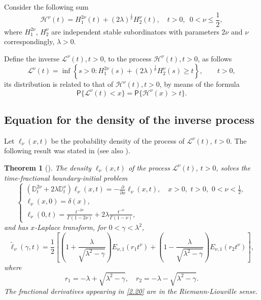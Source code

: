 \documentclass[12pt]{article}
\theoremstyle{definition}
\theoremstyle{plain}
\newtheorem{theorem}{Theorem}
\newcommand{\Prob}{\mathsf{P}}
\begin{document}
Consider the following sum
	\begin{equation}\label{2.1}
		\mathcal{H}^\nu(t) = H_1^{2\nu}(t) + (2\lambda)^{\frac{1}{\nu}} H_2^\nu(t), \quad t > 0,\,\,\, 0 < \nu \le \frac{1}{2},
	\end{equation}
	where  $H_1^{2\nu}$, $H_2^\nu$  are independent stable subordinators with parameters ${2\nu}$ and $\nu$ correspondingly, $\lambda > 0$. 
	
	Define the inverse $\mathcal{L}^\nu(t), t > 0$, to the process $\mathcal{H}^\nu(t), t > 0$, as follows
	\begin{equation}\label{1.13}
		\mathcal{L}^\nu(t) = \inf \left\{ s > 0 : H_1^{2\nu}(s) + (2\lambda)^{\frac{1}{\nu}} H_2^\nu(s) \ge t \right\}, \qquad t > 0,
	\end{equation}
	its distribution is related to that of $\mathcal{H}^\nu(t), t > 0$, by means of the formula
	\begin{equation}\label{1.14}
		\Prob\{\mathcal{L}^\nu(t) < x\} = \Prob\{\mathcal{H}^\nu(x) > t\}.
	\end{equation}
	
	
\subsection{Equation for the density of the inverse process}

	Let $\ell_\nu(x,t)$ be the probability density of the process of $\mathcal{L}^\nu(t)$, $t > 0$. The following result was stated in \cite{DovOrsToaldo} (see also \cite{OT2017}).
	
\begin{theorem}[\cite{DovOrsToaldo}]\label{densinv}	
	{The density $\ell_\nu(x,t)$ of the process $\mathcal{L}^\nu(t)$, $t > 0$, solves the time-fractional boundary-initial problem}
	\begin{equation}\label{2.20}
		\begin{cases}
			\left( \mathbb{D}_t^{2\nu} + 2\lambda \mathbb{D}_t^{\nu}\right) \ell_\nu(x,t) = -\frac{\partial}{\partial x} \ell_\nu(x,t), \quad x > 0,\,\, t > 0,\,\, 0 < \nu < \frac{1}{2}, \\
			\ell_\nu(x,0) = \delta(x), \\
			\ell_\nu(0,t) = \frac{t^{-2\nu}}{\Gamma(1-2\nu)} + 2\lambda \frac{t^{-\nu}}{\Gamma(1-\nu)},
		\end{cases}
	\end{equation}
	{and has $x$-Laplace transform, for $0 < \gamma < \lambda^2$,}
	\begin{equation}\label{2.21}
		\widetilde{\ell}_\nu(\gamma, t) = \frac{1}{2} \left[ \left( 1 + \frac{\lambda}{\sqrt{\lambda^2 - \gamma}} \right) E_{\nu,1} (r_1 t^\nu) + \left( 1 - \frac{\lambda}{\sqrt{\lambda^2 - \gamma}} \right) E_{\nu,1} (r_2 t^\nu) \right],
	\end{equation}
	{where}
	\begin{equation}\label{2.22}
		r_1 = -\lambda + \sqrt{\lambda^2 - \gamma}, \quad r_2 = -\lambda - \sqrt{\lambda^2 - \gamma}.
	\end{equation}
	{The fractional derivatives appearing in \eqref{2.20} are  in the Riemann-Liouville sense.}
\end{theorem}
\end{document}
